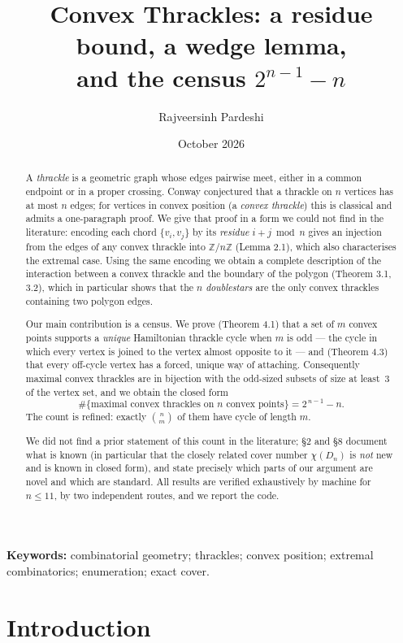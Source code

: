\documentclass[11pt,a4paper]{article}
\title{\bfseries Convex Thrackles: a residue bound, a wedge lemma,\\
and the census \texorpdfstring{$2^{n-1}-n$}{2\^{}(n-1) - n}}
\author{Rajveersinh Pardeshi}
\date{October 2026}
\theoremstyle{definition}
\theoremstyle{plain}
\begin{document}
\maketitle

\begin{abstract}
A \emph{thrackle} is a geometric graph whose edges pairwise meet, either in a
common endpoint or in a proper crossing.  Conway conjectured that a thrackle on
$n$ vertices has at most $n$ edges; for vertices in convex position (a
\emph{convex thrackle}) this is classical and admits a one-paragraph proof.  We
give that proof in a form we could not find in the literature: encoding each
chord $\{v_i,v_j\}$ by its \emph{residue} $i+j \bmod n$ gives an injection from
the edges of any convex thrackle into $\mathbb{Z}/n\mathbb{Z}$ (Lemma 2.1), which
also characterises the extremal case.  Using the same encoding we obtain a
complete description of the interaction between a convex thrackle and the
boundary of the polygon (Theorem 3.1, 3.2), which in particular shows that the
$n$ \emph{doublestars} are the only convex thrackles containing two polygon
edges.

Our main contribution is a census.  We prove (Theorem 4.1) that a set of $m$
convex points supports a \emph{unique} Hamiltonian thrackle cycle when $m$ is
odd --- the cycle in which every vertex is joined to the vertex almost opposite
to it --- and (Theorem 4.3) that every off-cycle vertex has a forced, unique way
of attaching.  Consequently maximal convex thrackles are in bijection with the
odd-sized subsets of size at least~$3$ of the vertex set, and we obtain the
closed form
\[
\#\{\text{maximal convex thrackles on $n$ convex points}\}=2^{\,n-1}-n .
\]
The count is refined: exactly $\binom{n}{m}$ of them have cycle of length $m$.

We did not find a prior statement of this count in the literature; §2 and §8
document what is known (in particular that the closely related cover number
$\chi(D_n)$ is \emph{not} new and is known in closed form), and state precisely
which parts of our argument are novel and which are standard.  All results are
verified exhaustively by machine for $n\le 11$, by two independent routes, and
we report the code.
\end{abstract}

\noindent\textbf{Keywords:} combinatorial geometry; thrackles; convex position;
extremal combinatorics; enumeration; exact cover.

\section{Introduction}
\end{document}
